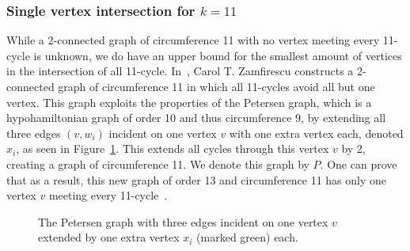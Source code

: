 \subsubsection{Single vertex intersection for $k=11$}
\label{sec:modified-petersen}

While a 2-connected graph of circumference 11 with no vertex meeting every 11-cycle is unknown, we do have an upper bound for the smallest amount of vertices in the intersection of all 11-cycle. In~\cite{article:zamfirescu}, Carol T. Zamfirescu constructs a 2-connected graph of circumference 11 in which all 11-cycles avoid all but one vertex. This graph exploits the properties of the Petersen graph, which is a hypohamiltonian graph of order 10 and thus circumference 9, by extending all three edges $(v,w_i)$ incident on one vertex $v$ with one extra vertex each, denoted $x_i$, as seen in Figure~\ref{fig:petersen-divided}. This extends all cycles through this vertex $v$ by 2, creating a graph of circumference 11. We denote this graph by $P$. One can prove that as a result, this new graph of order 13 and circumference 11 has only one vertex $v$ meeting every 11-cycle~\cite{article:zamfirescu}.

\begin{figure}
  \centering
  \caption{The Petersen graph with three edges incident on one vertex $v$ extended by one extra vertex $x_i$ (marked green) each.}
  \label{fig:petersen-divided}
\end{figure}

